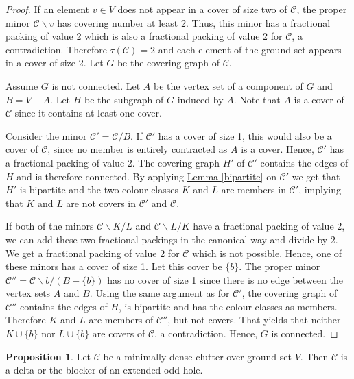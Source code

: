 \documentclass[a4paper, 12pt]{scrbook}
\theoremstyle{definition}
\newtheorem{proposition}[theorem]{Proposition}
\begin{document}
   \begin{proof}
       If an element $v \in V$ does not appear in a cover of size two of $\mathcal{C}$, the proper minor $\mathcal{C} \backslash v$ has covering number at least 2.
       Thus, this minor has a fractional packing of value 2 which is also a fractional packing of value 2 for $\mathcal{C}$, a contradiction.
       Therefore $\tau(\mathcal{C}) = 2$ and each element of the ground set appears in a cover of size 2.
       Let $G$ be the covering graph of $\mathcal{C}$.

       Assume $G$ is not connected.
       Let $A$ be the vertex set of a component of $G$ and $B = V - A$.
       Let $H$ be the subgraph of $G$ induced by $A$.
       Note that $A$ is a cover of $\mathcal{C}$ since it contains at least one cover.

       Consider the minor $\mathcal{C'}=\mathcal{C}/B$.
       If $\mathcal{C'}$ has a cover of size 1, this would also be a cover of $\mathcal{C}$, since no member is entirely contracted as $A$ is a cover.
       Hence, $\mathcal{C'}$ has a fractional packing of value 2.
       The covering graph $H'$ of $\mathcal{C'}$ contains the edges of $H$ and is therefore connected.
       By applying \hyperref[bipartite]{Lemma \ref*{bipartite}} on $\mathcal{C'}$ we get that $H'$ is bipartite and the two colour classes $K$ and $L$ are members in $\mathcal{C'}$, implying that $K$ and $L$ are not covers in $\mathcal{C'}$ and $\mathcal{C}$.

       If both of the minors $\mathcal{C} \backslash K / L$ and $\mathcal{C} \backslash L / K$ have a fractional packing of value 2, we can add these two fractional packings in the canonical way and divide by 2.
       We get a fractional packing of value 2 for $\mathcal{C}$ which is not possible.
       Hence, one of these minors has a cover of size 1.
       Let this cover be $\{b\}$.
       The proper minor $\mathcal{C''}=\mathcal{C} \backslash b / (B-\{b\})$ has no cover of size 1 since there is no edge between the vertex sets $A$ and $B$.
       Using the same argument as for $\mathcal{C'}$, the covering graph of $\mathcal{C''}$ contains the edges of $H$, is bipartite and has the colour classes as members.
       Therefore $K$ and $L$ are members of $\mathcal{C''}$, but not covers.
       That yields that neither $K \cup \{b\}$ nor $L \cup \{b\}$ are covers of $\mathcal{C}$, a contradiction.
       Hence, $G$ is connected.
   \end{proof}


   \begin{proposition}\label{twomember}
       Let $\mathcal{C}$ be a minimally dense clutter over ground set $V$.
       Then $\mathcal{C}$ is a delta or the blocker of an extended odd hole.
   \end{proposition}
\end{document}
